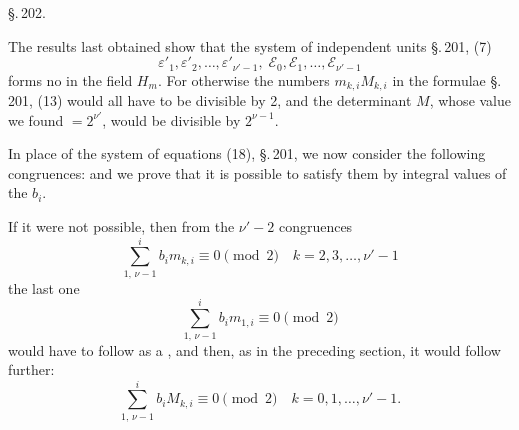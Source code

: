 
\S.\,202.


The results last obtained show that the system of independent
units \S.\,201, (7)
\[ \varepsilon'_1, \varepsilon'_2, \ldots, \varepsilon'_{\nu'-1}, \; \mathcal{E}_0, \mathcal{E}_1, \ldots, \mathcal{E}_{\nu'-1} \]
forms no  in the field $H_m$. For otherwise the
numbers $m_{k,i} M_{k,i}$ in the formulae \S.\,201, (13) would all have
to be divisible by 2, and the determinant $M$, whose value we
found $= 2^{\nu'}$, would be divisible by $2^{\nu-1}$.

In place of the system of equations (18), \S.\,201, we now consider
the following congruences:
and we prove that it is possible to satisfy them by integral
values of the $b_i$.

If it were not possible, then from the $\nu'-2$ congruences
\[ \sum_{1,\,\nu-1}^{i} b_i m_{k,i} \equiv 0 \pmod{2} \quad k = 2, 3, \ldots, \nu'-1 \]
the last one
\[ \sum_{1,\,\nu-1}^{i} b_i m_{1,i} \equiv 0 \pmod{2} \]
would have to follow as a , and then, as in the
preceding section, it would follow further:
\[ \sum_{1,\,\nu-1}^{i} b_i M_{k,i} \equiv 0 \pmod{2} \quad k = 0, 1, \ldots, \nu'-1. \]
